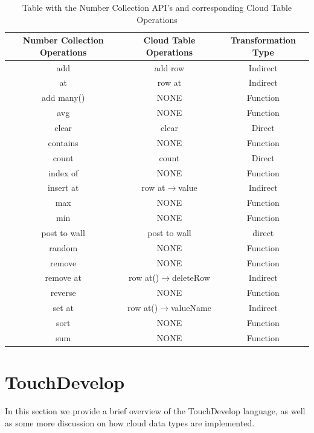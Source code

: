 \documentclass{sigplanconf}
\begin{document}
\begin{table}[htb!]
\centering
\begin{center}
\begin{tabular}{|c|c|c|}
 \hline
Number Collection Operations & Cloud Table Operations & Transformation Type\\
 \hline
  \hline
add & add row & Indirect \\ 
\hline
at & row at & Indirect \\
\hline
add many() & NONE & Function \\
\hline
avg & NONE & Function \\
\hline
clear & clear & Direct \\
\hline
contains & NONE & Function \\
\hline
count & count & Direct \\
\hline
index of &NONE  & Function \\
\hline
insert at & row at$\rightarrow$value & Indirect \\
\hline
max &NONE  & Function \\
\hline
min & NONE & Function \\
\hline
post to wall & post to wall & direct \\
\hline
random &NONE  & Function \\
\hline
remove  & NONE & Function \\
\hline
remove at & row at()$\rightarrow$deleteRow & Indirect \\
\hline
reverse &NONE  & Function \\
\hline
set at & row at()$\rightarrow$valueName & Indirect \\
\hline
sort & NONE & Function \\
\hline
sum & NONE & Function \\
\hline

\end{tabular}
\nocaptionrule
\caption{Table with the Number Collection API's and corresponding Cloud Table Operations}
\label{tab:mappingTable}
\end{center}
\end{table}%


\section{TouchDevelop}
\label{sec:TouchDevelop}
In this section we provide a brief overview of the TouchDevelop language, as well as some more discussion on how cloud data types are implemented.
\end{document}
